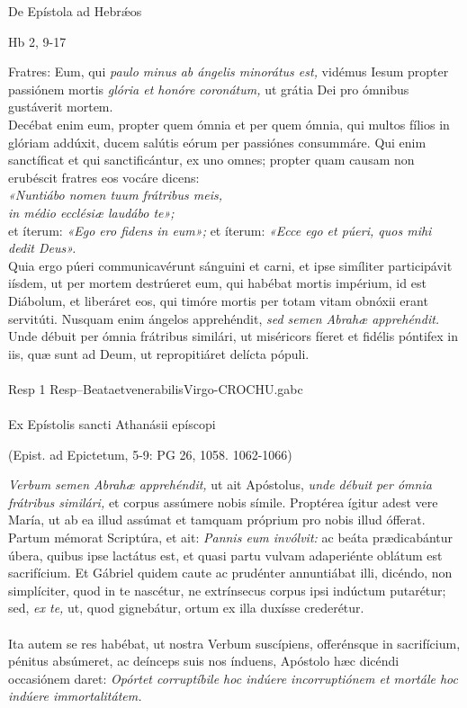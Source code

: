 \documentclass[options]{article}
\begin{document}
	De Epístola ad Hebr\'{æ}os 
\begin{flushright}
Hb 2, 9-17
\end{flushright}	
Fratres: Eum, qui \emph{paulo minus ab ángelis minorátus est,} vidémus Iesum propter passiónem mortis \emph{glória et honóre coronátum,} ut grátia Dei pro ómnibus gustáverit mortem.\\
Decébat enim eum, propter quem ómnia et per quem ómnia, qui multos fílios in glóriam addúxit, ducem salútis eórum per passiónes consummáre. Qui enim sanctíficat et qui sanctificántur, ex uno omnes; propter quam causam non erubéscit fratres eos vocáre dicens:\\
	\emph{«Nuntiábo nomen tuum frátribus meis,\\
	in médio ecclésiæ laudábo te»;}\\
et íterum: \emph{«Ego ero fidens in eum»;}
et íterum: \emph{«Ecce ego et púeri, quos mihi dedit Deus».}\\
Quia ergo púeri communicavérunt sánguini et carni, et ipse simíliter participávit iísdem, ut per mortem destrúeret eum, qui habébat mortis impérium, id est Diábolum, et liberáret eos, qui timóre mortis per totam vitam obnóxii erant servitúti. Nusquam enim ángelos apprehéndit, \emph{sed semen Abrahæ apprehéndit.} Unde débuit per ómnia frátribus similári, ut miséricors fíeret et fidélis póntifex in iis, quæ sunt ad Deum, ut repropitiáret delícta pópuli.\\
\\
Resp 1 Resp--BeataetvenerabilisVirgo-CROCHU.gabc\\
\\
Ex Epístolis sancti Athanásii epíscopi
\begin{flushright}
 (Epist. ad Epictetum, 5-9: PG 26, 1058. 1062-1066)	
\end{flushright}
\emph{Verbum semen Abrahæ apprehéndit,} ut ait Apóstolus, \emph{unde débuit per ómnia frátribus similári,} et corpus assúmere nobis símile. Proptérea ígitur adest vere María, ut ab ea illud assúmat et tamquam próprium pro nobis illud ófferat. Partum mémorat Scriptúra, et ait: \emph{Pannis eum invólvit:} ac beáta prædicabántur úbera, quibus ipse lactátus est, et quasi partu vulvam adaperiénte oblátum est sacrifícium. Et Gábriel quidem caute ac prudénter annuntiábat illi, dicéndo, non simplíciter, quod in te nascétur, ne extrínsecus corpus ipsi indúctum putarétur; sed, \emph{ex te,} ut, quod gignebátur, ortum ex illa duxísse crederétur.\\\\
Ita autem se res habébat, ut nostra Verbum suscípiens, offerénsque in sacrifícium, pénitus absúmeret, ac deínceps suis nos índuens, Apóstolo hæc dicéndi occasiónem daret: \emph{Opórtet corruptíbile hoc indúere incorruptiónem et mortále hoc indúere immortalitátem.}
\end{document}

